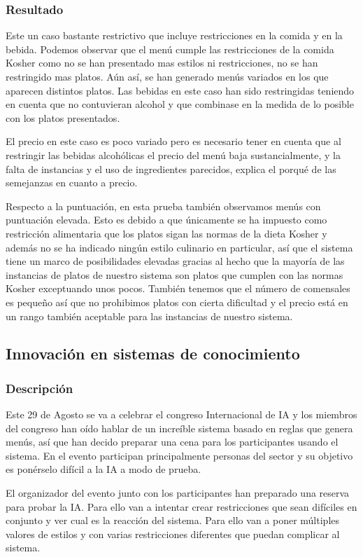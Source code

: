 \documentclass{article}
\begin{document}
\subsubsection{Resultado}
Este un caso bastante restrictivo que incluye restricciones en la comida y en la bebida. Podemos observar que el menú cumple las restricciones de la comida Kosher como no se han presentado mas estilos ni restricciones, no se han restringido mas platos. Aún así, se han generado menús variados en los que aparecen distintos platos. Las bebidas en este caso han sido restringidas teniendo en cuenta que no contuvieran alcohol y que combinase en la medida de lo posible con los platos presentados.
\par
El precio en este caso es poco variado pero es necesario tener en cuenta que al restringir las bebidas alcohólicas el precio del menú baja sustancialmente, y la falta de instancias y el uso de ingredientes parecidos, explica el porqué de las semejanzas en cuanto a precio.
\par
Respecto a la puntuación, en esta prueba también observamos menús con puntuación elevada. Esto es debido a que únicamente se ha impuesto como restricción alimentaria que los platos sigan las normas de la dieta Kosher y además no se ha indicado ningún estilo culinario en particular, así que el sistema tiene un marco de posibilidades elevadas gracias al hecho que la mayoría de las instancias de platos de nuestro sistema son platos que cumplen con las normas Kosher exceptuando unos pocos. También tenemos que el número de comensales es pequeño así que no prohibimos platos con cierta dificultad y el precio está en un rango también aceptable para las instancias de nuestro sistema.

\subsection{Innovación en sistemas de conocimiento}
\subsubsection{Descripción}
Este 29 de Agosto se va a celebrar el congreso Internacional de IA y los miembros del congreso han oído hablar de un increíble sistema basado en reglas que genera menús, así que han decido preparar una cena para los participantes usando el sistema. En el evento participan principalmente personas del sector y su objetivo es ponérselo difícil a la IA a modo de prueba.
\par
El organizador del evento junto con los participantes han preparado una reserva para probar la IA. Para ello van a intentar crear restricciones que sean difíciles en conjunto y ver cual es la reacción del sistema. Para ello van a poner múltiples valores de estilos y con varias restricciones diferentes que puedan complicar al sistema.
\end{document}
